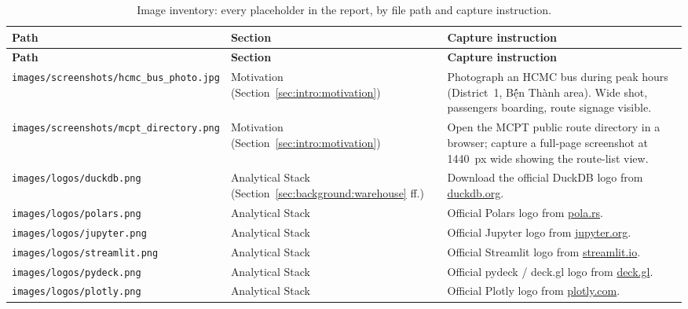 \begin{longtable}{p{3.4cm}p{4.6cm}p{6.5cm}}
\caption{Image inventory: every placeholder in the report, by
file path and capture instruction.}
\label{tab:appendix:images}\\
\hline
\textbf{Path} & \textbf{Section} & \textbf{Capture instruction} \\
\hline
\endfirsthead
\hline
\textbf{Path} & \textbf{Section} & \textbf{Capture instruction} \\
\hline
\endhead

\texttt{images/screenshots/\linebreak hcmc\_bus\_photo.jpg}
& Motivation (Section~\ref{sec:intro:motivation})
& Photograph an HCMC bus during peak hours (District~1,
  B\d ến Th\`anh area). Wide shot, passengers boarding,
  route signage visible. \\

\texttt{images/screenshots/\linebreak mcpt\_directory.png}
& Motivation (Section~\ref{sec:intro:motivation})
& Open the MCPT public route directory in a browser; capture a
  full-page screenshot at 1440~px wide showing the route-list
  view. \\

\texttt{images/logos/\linebreak duckdb.png}
& Analytical Stack (Section~\ref{sec:background:warehouse} ff.)
& Download the official DuckDB logo from \url{duckdb.org}. \\

\texttt{images/logos/\linebreak polars.png}
& Analytical Stack
& Official Polars logo from \url{pola.rs}. \\

\texttt{images/logos/\linebreak jupyter.png}
& Analytical Stack
& Official Jupyter logo from \url{jupyter.org}. \\

\texttt{images/logos/\linebreak streamlit.png}
& Analytical Stack
& Official Streamlit logo from \url{streamlit.io}. \\

\texttt{images/logos/\linebreak pydeck.png}
& Analytical Stack
& Official pydeck / deck.gl logo from \url{deck.gl}. \\

\texttt{images/logos/\linebreak plotly.png}
& Analytical Stack
& Official Plotly logo from \url{plotly.com}. \\


\end{longtable}
